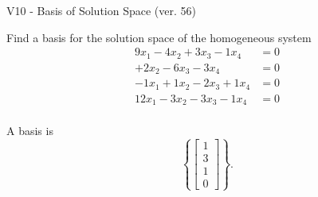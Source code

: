 \begin{exercise}
  \begin{exerciseTitle}V10 - Basis of Solution Space (ver. 56)\end{exerciseTitle}
  \begin{exerciseStatement}
    Find a basis for the solution space of the homogeneous system 
\begin{align*}
 9 x_ 1 -4 x_ 2 + 3 x_ 3 -1 x_ 4 &= 0  \\ 
  + 2 x_ 2 -6 x_ 3 -3 x_ 4 &= 0  \\ 
  -1 x_ 1 + 1 x_ 2 -2 x_ 3 + 1 x_ 4 &= 0  \\ 
  12 x_ 1 -3 x_ 2 -3 x_ 3 -1 x_ 4 &= 0  \\ 
 \end{align*}


 
  \end{exerciseStatement}

  \begin{exerciseAnswer}
   A basis is   
\[\left\{\left[\begin{array}{c}
1 \\
3 \\
1 \\
0
\end{array}\right]\right\}.\]

  


  \end{exerciseAnswer}
\end{exercise}